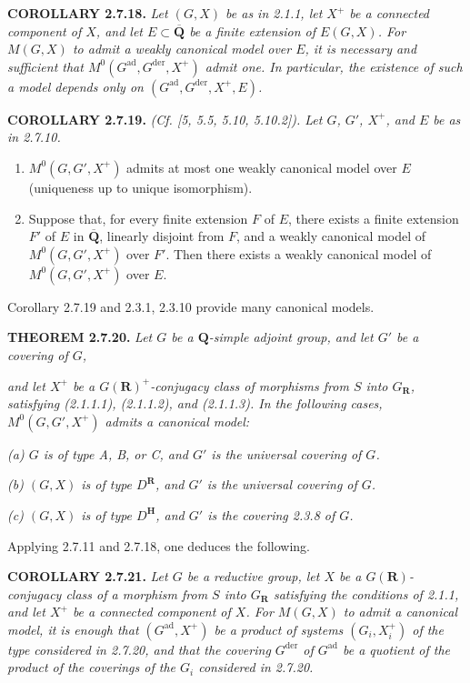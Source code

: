\documentclass[10pt,a4paper]{article}
\newcommand{\SourcePage}[2]{\clearpage\setcounter{page}{#2}\typeout{D031_SOURCE_PAGE physical=#1 printed=#2}}
\begin{document}
\textbf{COROLLARY 2.7.18.} \emph{Let \((G,X)\) be as in 2.1.1, let \(X^+\) be a connected component of \(X\), and let \(E\subset\overline{\mathbf Q}\) be a finite extension of \(E(G,X)\). For \(M(G,X)\) to admit a weakly canonical model over \(E\), it is necessary and sufficient that \(M^0(G^{\mathrm{ad}},G^{\mathrm{der}},X^+)\) admit one. In particular, the existence of such a model depends only on \((G^{\mathrm{ad}},G^{\mathrm{der}},X^+,E)\).}

\textbf{COROLLARY 2.7.19.} \emph{(Cf. {[}5, 5.5, 5.10, 5.10.2{]}). Let \(G\), \(G'\), \(X^+\), and \(E\) be as in 2.7.10.}

\begin{enumerate}
\def\labelenumi{(\roman{enumi})}
\item
  \(M^0(G,G',X^+)\) admits at most one weakly canonical model over \(E\) (uniqueness up to unique isomorphism).
\item
  Suppose that, for every finite extension \(F\) of \(E\), there exists a finite extension \(F'\) of \(E\) in \(\overline{\mathbf Q}\), linearly disjoint from \(F\), and a weakly canonical model of \(M^0(G,G',X^+)\) over \(F'\). Then there exists a weakly canonical model of \(M^0(G,G',X^+)\) over \(E\).
\end{enumerate}

Corollary 2.7.19 and 2.3.1, 2.3.10 provide many canonical models.

\textbf{THEOREM 2.7.20.} \emph{Let \(G\) be a \(\mathbf Q\)-simple adjoint group, and let \(G'\) be a covering of \(G\),}

\SourcePage{43}{289}
\emph{and let \(X^+\) be a \(G(\mathbf R)^+\)-conjugacy class of morphisms from \(S\) into \(G_{\mathbf R}\), satisfying (2.1.1.1), (2.1.1.2), and (2.1.1.3). In the following cases, \(M^0(G,G',X^+)\) admits a canonical model:}

\emph{(a) \(G\) is of type A, B, or C, and \(G'\) is the universal covering of \(G\).}

\emph{(b) \((G,X)\) is of type \(D^{\mathbf R}\), and \(G'\) is the universal covering of \(G\).}

\emph{(c) \((G,X)\) is of type \(D^{\mathbf H}\), and \(G'\) is the covering 2.3.8 of \(G\).}

Applying 2.7.11 and 2.7.18, one deduces the following.

\textbf{COROLLARY 2.7.21.} \emph{Let \(G\) be a reductive group, let \(X\) be a \(G(\mathbf R)\)-conjugacy class of a morphism from \(S\) into \(G_{\mathbf R}\) satisfying the conditions of 2.1.1, and let \(X^+\) be a connected component of \(X\). For \(M(G,X)\) to admit a canonical model, it is enough that \((G^{\mathrm{ad}},X^+)\) be a product of systems \((G_i,X_i^+)\) of the type considered in 2.7.20, and that the covering \(G^{\mathrm{der}}\) of \(G^{\mathrm{ad}}\) be a quotient of the product of the coverings of the \(G_i\) considered in 2.7.20.}
\end{document}
